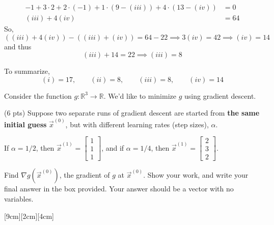 \documentclass[11pt]{article}
\begin{document}
\begin{prob}
\begin{solution}
\begin{itemize}
\begin{align*}
    -1 + 3 \cdot 2 + 2 \cdot (-1) + 1 \cdot (9 - (iii)) + 4 \cdot (13 - (iv)) &= 0 \\
    (iii) + 4(iv) &= 64
    \end{align*}
    So,
    $$\left( (iii) + 4(iv) \right) - \left( (iii) + (iv) \right) = 64 - 22 \implies 3(iv) = 42 \implies \boxed{(iv) = 14}$$
    and thus
    $$(iii) + 14 = 22 \implies \boxed{(iii) = 8}$$
\end{itemize}

To summarize,
\[
\boxed{(i)=17,\qquad (ii)=8,\qquad (iii)=8,\qquad (iv)=14}
\]
\end{solution}

\end{prob}

\newpage

\begin{prob}
Consider the function $g: \mathbb{R}^3 \to \mathbb{R}$. We'd like to minimize $g$ using gradient descent.
\begin{subprob} (6 pts)  Suppose two separate runs of gradient descent are started from \textbf{the same initial guess} $\vec x^{(0)}$, but with different learning rates (step sizes), $\alpha$.

If $\alpha = 1/2$, then $\vec x^{(1)} = \begin{bmatrix} 1 \\ 1 \\ 1 \end{bmatrix}$, and if $\alpha = 1/4$, then $\vec x^{(1)} = \begin{bmatrix} 2 \\ 3 \\ 2 \end{bmatrix}$.

Find $\nabla g(\vec x^{(0)})$, the gradient of $g$ at $\vec x^{(0)}$. Show your work, and write your final answer in the box provided. Your answer should be a vector with no variables.

[9cm][2cm][4cm]


\end{subprob}
\end{prob}
\end{document}
